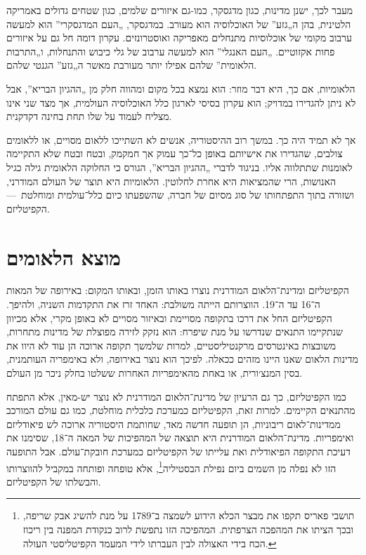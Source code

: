 מעבר לכך, ישנן מדינות, כגון מדגסקר, כמו-גם איזורים שלמים, כגון שטחים גדולים באמריקה הלטינית, בהן ה„גזע” של האוכלוסיה הוא מעורב. במדגסקר, „העם המדגסקרי” הוא למעשה ערבוב מקומי של אוכלוסיות מתנחלים מאפריקה ואוסטרונזים. עקרון דומה חל גם על איזורים פחות אקזוטיים. „העם האנגלי” הוא למעשה ערבוב של גלי כיבוש והתנחלות, ו„התרבות הלאומית” שלהם אפילו יותר מעורבת מאשר ה„גזע” הגנטי שלהם.

הלאומיות, אם כך, היא דבר מוזר: הוא נמצא בכל מקום ומהווה חלק מן „ההגיון הבריא”, אבל לא ניתן להגדירו במדויק; הוא עקרון בסיסי לארגון כלל האוכלוסיה העולמית, אך מצד שני אינו מצליח לעמוד על שלו תחת בחינה דקדקנית.

אך לא תמיד היה כך. במשך רוב ההיסטוריה, אנשים לא השתייכו ללאום מסויים, או ללאומים צולבים, שהגדירו את אישיותם באופן כל־כך עמוק אך חמקמק, ובטח ובטח שלא התקיימה לאומנות שתתלווה אליו. בניגוד לדברי „ההגיון הבריא”, הגורס כי החלוקה הלאומית גילה כגיל האנושות, הרי שהמציאות היא אחרת לחלוטין. הלאומיות היא תוצר של העולם המודרני, ושזורה בתוך התפתחותו של סוג מסיום של חברה, שהשפעתו כיום כלל־עולמית ומוחלטת~— הקפיטליזם.



\section*{מוצא הלאומים}

הקפיטליזם ומדינת־הלאום המודרנית נוצרו באותו הזמן, ובאותו המקום: באירופה של המאות ה־16 עד ה־19. הווצרותם הייתה משולבת: האחד זרז את התקדמות השניה, ולהיפך. הקפיטליזם החל את דרכו בתקופה מסויימת ובאיזור מסויים לא באופן מקרי, אלא מכיוון שנתקיימו התנאים שנדרשו על מנת שיפרח: הוא נזקק לזירה מפוצלת של מדינות מתחרות, משובצות באינטרסים מרקנטיליסטיים, למרות שלמשך תקופה ארוכה הן עוד לא היוו את מדינות הלאום שאנו היינו מזהים ככאלה. לפיכך הוא נוצר באירופה, ולא באימפריה העותמנית, בסין המנצ׳ורית, או באחת מהאימפריות האחרות ששלטו בחלק ניכר מן העולם.

כמו הקפיטליזם, כך גם הרעיון של מדינת־הלאום המודרנית לא נוצר יש-מאין, אלא התפתח מהתנאים הקיימים. למרות זאת, הקפיטליזם כמערכת כלכלית מוחלטת, כמו גם עולם המורכב ממדינות־לאום ריבוניות, הן תופעה חדשה מאד, שחותמת היסטוריה ארוכה לש פיאודליזם ואימפריות. מדינת־הלאום המודרנית היא תוצאה של המהפיכות של המאה ה־18, שסימנו את דעיכת התקופה הפיאודלית ואת עלייתו של הקפיטליזם כמערכת חובקת־עולם. אבל התופעה הזו לא נפלה מן השמים ביום נפילת הבסטיליה\footnote{תושבי פאריס תקפו את מבצר הכלא הידוע לשמצה ב־1789 על מנת להשיג אבק שריפה, ובכך הציתו את המהפכה הצרפתית. המהפיכה הזו נתפשת לרוב כנקודת המפנה בין ריכוז הכח בידי האצולה לבין העברתו לידי המעמד הקפיטליסטי העולה.}, אלא טופחה ופותחה במקביל להווצרותו והבשלתו של הקפיטליזם.

